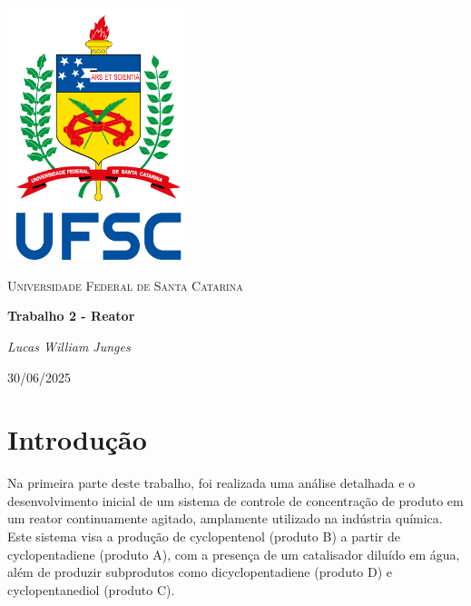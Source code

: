 \documentclass[a4paper,12pt]{article}
\newcommand{\reporttitle}{Trabalho 2 - Reator}
\newcommand{\reportauthor}{
Lucas William Junges}
\newcommand{\reportdate}{30/06/2025}
\begin{document}
\begin{titlepage}
    \centering
    \vspace*{1cm}
    \includegraphics[width=0.4\textwidth]{Imagens/BrasaoUFSC.png} %
    \par\vspace{1cm}
    {\scshape\Large Universidade Federal de Santa Catarina\par} %
    \vspace{1.2cm}
    {\huge\bfseries \reporttitle\par}
    \vspace{2cm}
    {\Large\itshape \reportauthor\par}
    \vfill
    {\large \reportdate\par}
\end{titlepage}

\listoffigures
\clearpage

\tableofcontents
\clearpage



\section{Introdução}

Na primeira parte deste trabalho, foi realizada uma análise detalhada e o desenvolvimento inicial de um sistema de controle de concentração de produto em um reator continuamente agitado, amplamente utilizado na indústria química. Este sistema visa a produção de cyclopentenol (produto B) a partir de cyclopentadiene (produto A), com a presença de um catalisador diluído em água, além de produzir subprodutos como dicyclopentadiene (produto D) e cyclopentanediol (produto C).
\end{document}
